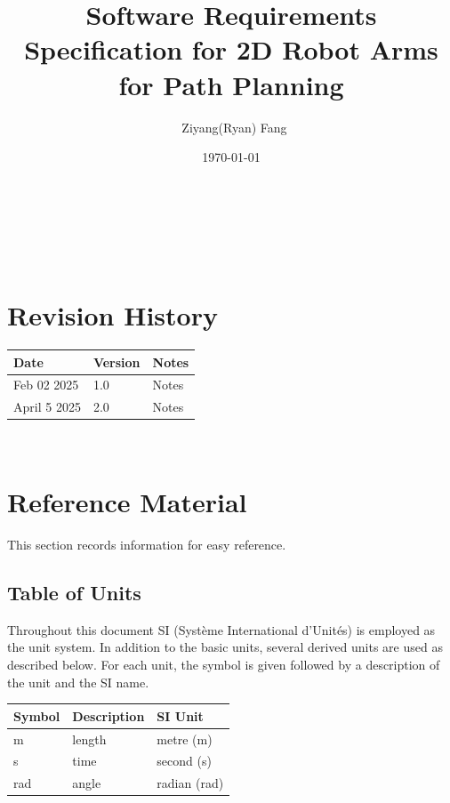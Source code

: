 \documentclass[12pt]{article}
\begin{document}
\title{Software Requirements Specification for 2D Robot Arms for Path Planning} 
\author{\ Ziyang(Ryan) Fang}
\date{\today}
	
\maketitle

~\newpage


\tableofcontents

~\newpage

\section*{Revision History}

\begin{tabularx}{\textwidth}{p{3cm}p{2cm}X}
\toprule {\bf Date} & {\bf Version} & {\bf Notes}\\
\midrule
Feb 02 2025 & 1.0 & Notes\\
April 5 2025 & 2.0 & Notes\\
\bottomrule
\end{tabularx}



~\newpage

\section{Reference Material}

This section records information for easy reference.

\subsection{Table of Units}

Throughout this document SI (Syst\`{e}me International d'Unit\'{e}s) is employed
as the unit system.  In addition to the basic units, several derived units are
used as described below.  For each unit, the symbol is given followed by a
description of the unit and the SI name.
~\newline

\renewcommand{\arraystretch}{1.2}
  \noindent \begin{tabular}{l l l} 
    \toprule		
    \textbf{Symbol} & \textbf{Description} & \textbf{SI Unit}\\
    \midrule 
    \si{\metre} & length & metre (m) \\
    \si{\second} & time & second (s) \\
    \si{\radian} & angle & radian (rad) \\
    \bottomrule
  \end{tabular}
\end{document}
